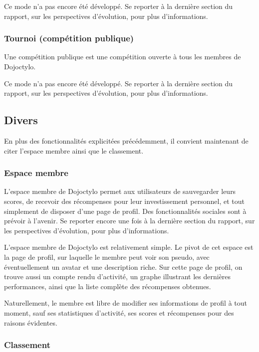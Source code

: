 \documentclass[a4paper,12pt]{article}
\begin{document}
Ce mode n'a pas encore été développé. Se reporter à la dernière section du rapport, sur les perspectives d'évolution, pour plus d'informations.

\subsubsection{Tournoi (compétition publique)}

Une compétition publique est une compétition ouverte à tous les membres de Dojoctylo.

Ce mode n'a pas encore été développé. Se reporter à la dernière section du rapport, sur les perspectives d'évolution, pour plus d'informations.

\subsection{Divers}

En plus des fonctionnalités explicitées précédemment, il convient maintenant de citer l'espace membre ainsi que le classement.

\subsubsection{Espace membre}

L'espace membre de Dojoctylo permet aux utilisateurs de sauvegarder leurs scores, de recevoir des récompenses pour leur investissement personnel, et tout simplement de disposer d'une page de profil. Des fonctionnalités sociales sont à prévoir à l'avenir. Se reporter encore une fois à la dernière section du rapport, sur les perspectives d'évolution, pour plus d'informations.

L'espace membre de Dojoctylo est relativement simple. Le pivot de cet espace est la page de profil, sur laquelle le membre peut voir son pseudo, avec éventuellement un avatar et une description riche. Sur cette page de profil, on trouve aussi un compte rendu d'activité, un graphe illustrant les dernières performances, ainsi que la liste complète des récompenses obtenues.

Naturellement, le membre est libre de modifier ses informations de profil à tout moment, sauf ses statistiques d'activité, ses scores et récompenses pour des raisons évidentes.

\subsubsection{Classement}
\end{document}
